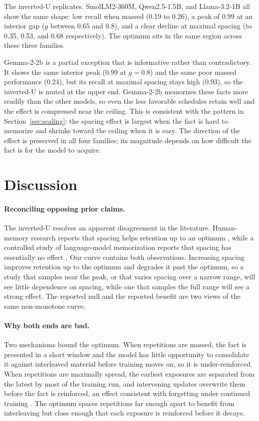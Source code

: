 \documentclass[10pt]{article}
\begin{document}
The inverted-U replicates. SmolLM2-360M, Qwen2.5-1.5B, and Llama-3.2-1B all show the same shape:
low recall when massed (0.19 to 0.26), a peak of 0.99 at an interior gap ($g$ between 0.65
and 0.8), and a clear decline at maximal spacing (to 0.35, 0.53, and 0.68 respectively). The
optimum sits in the same region across these three families.

Gemma-2-2b is a partial exception that is informative rather than contradictory. It shows the same
interior peak (0.99 at $g=0.8$) and the same poor massed performance (0.24), but its recall at
maximal spacing stays high (0.93), so the inverted-U is muted at the upper end. Gemma-2-2b memorizes
these facts more readily than the other models, so even the less favorable schedules retain well and
the effect is compressed near the ceiling. This is consistent with the pattern in
Section~\ref{sec:scaling}: the spacing effect is largest when the fact is hard to memorize and
shrinks toward the ceiling when it is easy. The direction of the effect is preserved in all four
families; its magnitude depends on how difficult the fact is for the model to acquire.

\section{Discussion}
\label{sec:discussion}

\paragraph{Reconciling opposing prior claims.} The inverted-U resolves an apparent disagreement in
the literature. Human-memory research reports that spacing helps retention up to an optimum
\citep{cepeda2008spacing}, while a controlled study of language-model memorization reports that
spacing has essentially no effect \citep{tirumala2022memorization}. Our curve contains both
observations. Increasing spacing improves retention up to the optimum and degrades it past the
optimum, so a study that samples near the peak, or that varies spacing over a narrow range, will
see little dependence on spacing, while one that samples the full range will see a strong effect.
The reported null and the reported benefit are two views of the same non-monotone curve.

\paragraph{Why both ends are bad.} Two mechanisms bound the optimum. When repetitions are massed,
the fact is presented in a short window and the model has little opportunity to consolidate it
against interleaved material before training moves on, so it is under-reinforced. When repetitions
are maximally spread, the earliest exposures are separated from the latest by most of the training
run, and intervening updates overwrite them before the fact is reinforced, an effect consistent
with forgetting under continued training \citep{luo2023empirical}. The optimum spaces repetitions
far enough apart to benefit from interleaving but close enough that each exposure is reinforced
before it decays.
\end{document}
